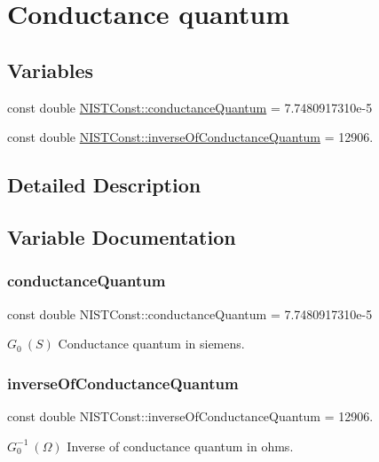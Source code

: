 \hypertarget{group___n_i_s_t_const-_conductance_quantum}{}\section{Conductance quantum}
\label{group___n_i_s_t_const-_conductance_quantum}
\subsection*{Variables}
\begin{DoxyCompactItemize}
\item 
const double \mbox{\hyperlink{group___n_i_s_t_const-_conductance_quantum_gac57088a56b37d0b899d3e9c9babaadaf}{N\+I\+S\+T\+Const\+::conductance\+Quantum}} = 7.\+7480917310e-\/5
\item 
const double \mbox{\hyperlink{group___n_i_s_t_const-_conductance_quantum_ga39f726a47f146a434d7fca49fc2aeb30}{N\+I\+S\+T\+Const\+::inverse\+Of\+Conductance\+Quantum}} = 12906.
\end{DoxyCompactItemize}


\subsection{Detailed Description}


\subsection{Variable Documentation}
\mbox{\label{group___n_i_s_t_const-_conductance_quantum_gac57088a56b37d0b899d3e9c9babaadaf}} 
\subsubsection{\texorpdfstring{conductance\+Quantum}{conductanceQuantum}}
{\footnotesize\ttfamily const double N\+I\+S\+T\+Const\+::conductance\+Quantum = 7.\+7480917310e-\/5}

$G_0 \ (S)$ Conductance quantum in siemens. \mbox{\label{group___n_i_s_t_const-_conductance_quantum_ga39f726a47f146a434d7fca49fc2aeb30}} 
\subsubsection{\texorpdfstring{inverse\+Of\+Conductance\+Quantum}{inverseOfConductanceQuantum}}
{\footnotesize\ttfamily const double N\+I\+S\+T\+Const\+::inverse\+Of\+Conductance\+Quantum = 12906.}

$G_0^{-1} \ (\Omega)$ Inverse of conductance quantum in ohms. 